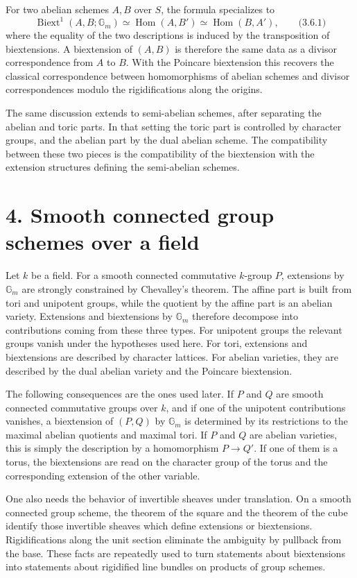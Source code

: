 \documentclass[11pt]{article}
\providecommand{\Gm}{\mathbb G_m}
\providecommand{\Hom}{\operatorname{Hom}}
\providecommand{\Biext}{\operatorname{Biext}}
\providecommand{\Hom}{\operatorname{Hom}}
\providecommand{\Gm}{\mathbb G_m}
\begin{document}
For two abelian schemes \(A,B\) over \(S\), the formula specializes to
\[
        \Biext^1(A,B;\Gm)\simeq \Hom(A,B')
        \simeq \Hom(B,A'),
\qquad\text{(3.6.1)}
\]
where the equality of the two descriptions is induced by the transposition of biextensions.  A biextension of \((A,B)\) is therefore the same data as a divisor correspondence from \(A\) to \(B\).  With the Poincare biextension this recovers the classical correspondence between homomorphisms of abelian schemes and divisor correspondences modulo the rigidifications along the origins.

The same discussion extends to semi-abelian schemes, after separating the abelian and toric parts.  In that setting the toric part is controlled by character groups, and the abelian part by the dual abelian scheme.  The compatibility between these two pieces is the compatibility of the biextension with the extension structures defining the semi-abelian schemes.

\section*{4. Smooth connected group schemes over a field}

Let \(k\) be a field.  For a smooth connected commutative \(k\)-group \(P\), extensions by \(\Gm\) are strongly constrained by Chevalley's theorem.  The affine part is built from tori and unipotent groups, while the quotient by the affine part is an abelian variety.  Extensions and biextensions by \(\Gm\) therefore decompose into contributions coming from these three types.  For unipotent groups the relevant groups vanish under the hypotheses used here.  For tori, extensions and biextensions are described by character lattices.  For abelian varieties, they are described by the dual abelian variety and the Poincare biextension.

The following consequences are the ones used later.  If \(P\) and \(Q\) are smooth connected commutative groups over \(k\), and if one of the unipotent contributions vanishes, a biextension of \((P,Q)\) by \(\Gm\) is determined by its restrictions to the maximal abelian quotients and maximal tori.  If \(P\) and \(Q\) are abelian varieties, this is simply the description by a homomorphism \(P\to Q'\).  If one of them is a torus, the biextensions are read on the character group of the torus and the corresponding extension of the other variable.

One also needs the behavior of invertible sheaves under translation.  On a smooth connected group scheme, the theorem of the square and the theorem of the cube identify those invertible sheaves which define extensions or biextensions.  Rigidifications along the unit section eliminate the ambiguity by pullback from the base.  These facts are repeatedly used to turn statements about biextensions into statements about rigidified line bundles on products of group schemes.
\end{document}
